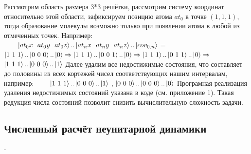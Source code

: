 \documentclass[12pt, a4paper]{article}
\begin{document}
\newline\null\qquad
Рассмотрим область размера 3*3 решётки, рассмотрим систему координат относительно этой области, зафиксируем позицию атома $at_0$ в точке $(1,1,1)$, тогда образование молекулы возможно только при появлении атома в любой из отмеченных точек. Например:\newline \null
$\qquad \ket{at_0x\ \ at_0y\ \ at_0z}..\ket{at_nx\ \ at_ny\ \ at_nz}..\ket{cov_{0,n}}$ = $\ket{1\ 1\ 1}..\ket{0 \ 0 \ 0}..\ket{0} \Rightarrow \ket{1\ 1\ 1}..\ket{0 \ 0 \ 1}..\ket{0} \Rightarrow \ket{1\ 1\ 1}..\ket{0 \ 1 \ 1}..\ket{0} \Rightarrow$ $\ket{1\ 1\ 1}..\ket{0 \ 0 \ 0}..\ket{1}$\newline \null\qquad
Далее удалим все недостижимые состояния, что составляет до половины из всех кортежей чисел соответствующих нашим интервалам, например:\newline \null
$\qquad\ket{1\ 1\ 1}..\ket{0 \ 0 \ 0}..\ket{1}$ 
, 
$\ket{0\ 0\ 0}..\ket{0 \ 0 \ 0}..\ket{0}$\newline \null\qquad
Програмная реализация удаления недостижимых состояний указана в коде (см. приложение 1). Такая редукция числа состояний позволит снизить вычислительную сложность задачи.
\subsection{Численный расчёт неунитарной динамики}
-
\end{document}
